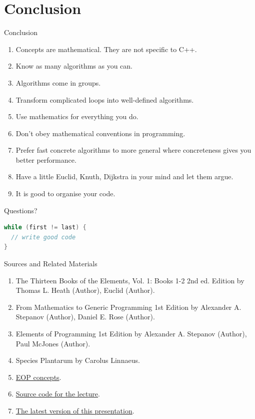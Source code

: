 \documentclass[10pt]{beamer}
\begin{document}
\section{Conclusion}
\begin{frame}{Conclusion}
  \begin{enumerate}
    \item Concepts are mathematical. They are not specific to C++.
    \item Know as many algorithms as you can.
    \item Algorithms come in groups.
    \item Transform complicated loops into well-defined algorithms.
    \item Use mathematics for everything you do.
    \item Don't obey mathematical conventions in programming.
    \item Prefer fast concrete algorithms to more general where concreteness gives you better performance.
    \item Have a little Euclid, Knuth, Dijkstra in your mind and let them argue.
    \item It is good to organise your code.
  \end{enumerate}
\end{frame}

\begin{frame}[fragile]{Questions?}
\begin{lstlisting}[language=C++,basicstyle=\huge]
while (first != last) {
  // write good code
}
\end{lstlisting}
\end{frame}

\begin{frame}{Sources and Related Materials}
  \begin{enumerate}
    \item The Thirteen Books of the Elements, Vol. 1: Books 1-2 2nd ed. Edition by Thomas L. Heath (Author), Euclid (Author).
    \item From Mathematics to Generic Programming 1st Edition by Alexander A. Stepanov (Author), Daniel E. Rose (Author).
    \item Elements of Programming 1st Edition by Alexander A. Stepanov (Author), Paul McJones (Author).
    \item Species Plantarum by Carolus Linnaeus.
    \item \href{http://elementsofprogramming.com/eop-concepts.pdf}{EOP concepts}.
    \item \href{https://github.com/tshev/tshev.github.io/tree/master/files/presentations/CppCon/2019/6-algorithmic-journeys-with-concepts/code}{Source code for the lecture}.
    \item \href{https://github.com/tshev/tshev.github.io/blob/master/files/presentations/CppCon/2019/6-algorithmic-journeys-with-concepts/demo.pdf}{The latest version of this presentation}.
  \end{enumerate}
\end{frame}
\end{document}

